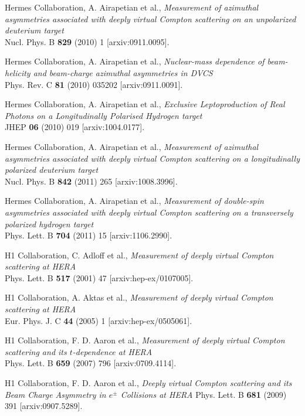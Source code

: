 \documentclass[11pt,a4paper]{article}
\begin{document}
\begin{thebibliography}{10}
H{\sc ermes} Collaboration, A. Airapetian et al., \emph{Measurement of azimuthal asymmetries associated with deeply virtual Compton scattering on an unpolarized deuterium target}
\\Nucl. Phys. B {\bf 829} (2010) 1 [arxiv:0911.0095].

H{\sc ermes} Collaboration, A. Airapetian et al., \emph{Nuclear-mass dependence of beam-helicity and beam-charge azimuthal asymmetries in DVCS}
\\Phys. Rev. C {\bf 81} (2010) 035202 [arxiv:0911.0091].

H{\sc ermes} Collaboration, A. Airapetian et al., \emph{Exclusive Leptoproduction of Real Photons on a Longitudinally Polarised Hydrogen target}
\\JHEP {\bf 06} (2010) 019 [arxiv:1004.0177].

H{\sc ermes} Collaboration, A. Airapetian et al., \emph{Measurement of azimuthal asymmetries associated with deeply virtual Compton scattering on a longitudinally polarized deuterium target}
\\Nucl. Phys. B {\bf 842} (2011) 265 [arxiv:1008.3996].

H{\sc ermes} Collaboration, A. Airapetian et al., \emph{Measurement of double-spin asymmetries associated with deeply virtual Compton scattering on a transversely polarized hydrogen target}
\\Phys. Lett. B {\bf 704} (2011) 15 [arxiv:1106.2990].

H1 Collaboration, C. Adloff et al., \emph{Measurement of deeply virtual Compton scattering at HERA}
\\Phys. Lett. B {\bf 517} (2001) 47 [arxiv:hep-ex/0107005].
 
H1 Collaboration, A. Aktas et al., \emph{Measurement of deeply virtual Compton scattering at HERA}
\\Eur. Phys. J. C {\bf 44} (2005) 1 [arxiv:hep-ex/0505061].

H1 Collaboration, F. D. Aaron et al., \emph{Measurement of deeply virtual Compton scattering and its $t$-dependence at HERA}
\\Phys. Lett. B {\bf 659} (2007) 796 [arxiv:0709.4114].

H1 Collaboration, F. D. Aaron et al., \emph{Deeply virtual Compton scattering and its Beam Charge Asymmetry in $e^{\pm}$ Collisions at HERA}
Phys. Lett. B {\bf 681} (2009) 391 [arxiv:0907.5289].


\end{thebibliography}
\end{document}
